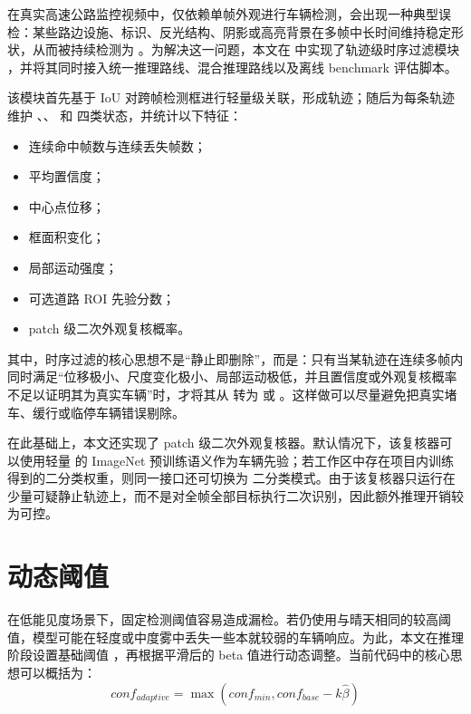 在真实高速公路监控视频中，仅依赖单帧外观进行车辆检测，会出现一种典型误检：某些路边设施、标识、反光结构、阴影或高亮背景在多帧中长时间维持稳定形状，从而被持续检测为 。为解决这一问题，本文在  中实现了轨迹级时序过滤模块 ，并将其同时接入统一推理路线、混合推理路线以及离线 benchmark 评估脚本\cite{improvedDeepsortFog2024}。

该模块首先基于 IoU 对跨帧检测框进行轻量级关联，形成轨迹；随后为每条轨迹维护 、、 和  四类状态，并统计以下特征：

\begin{itemize}[leftmargin=2em]
\item 连续命中帧数与连续丢失帧数；
\item 平均置信度；
\item 中心点位移；
\item 框面积变化；
\item 局部运动强度；
\item 可选道路 ROI 先验分数；
\item patch 级二次外观复核概率。
\end{itemize}

其中，时序过滤的核心思想不是“静止即删除”，而是：只有当某轨迹在连续多帧内同时满足“位移极小、尺度变化极小、局部运动极低，并且置信度或外观复核概率不足以证明其为真实车辆”时，才将其从  转为  或 。这样做可以尽量避免把真实堵车、缓行或临停车辆错误剔除。

在此基础上，本文还实现了 patch 级二次外观复核器。默认情况下，该复核器可以使用轻量  的 ImageNet 预训练语义作为车辆先验；若工作区中存在项目内训练得到的二分类权重，则同一接口还可切换为  二分类模式。由于该复核器只运行在少量可疑静止轨迹上，而不是对全帧全部目标执行二次识别，因此额外推理开销较为可控。

\section{动态阈值}

在低能见度场景下，固定检测阈值容易造成漏检。若仍使用与晴天相同的较高阈值，模型可能在轻度或中度雾中丢失一些本就较弱的车辆响应。为此，本文在推理阶段设置基础阈值 ，再根据平滑后的 beta 值进行动态调整。当前代码中的核心思想可以概括为：
\begin{equation}
conf_{adaptive} = \max(conf_{min}, conf_{base} - k\hat{\beta})
\end{equation}

